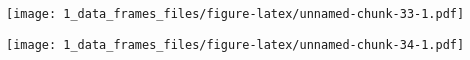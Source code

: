 \documentclass[
]{article}
\newenvironment{Shaded}{\begin{snugshade}}{\end{snugshade}}
\newcommand{\FunctionTok}[1]{\textcolor[rgb]{0.00,0.00,0.00}{#1}}
\newcommand{\NormalTok}[1]{#1}
\newcommand{\SpecialCharTok}[1]{\textcolor[rgb]{0.00,0.00,0.00}{#1}}
\begin{document}
\begin{Shaded}
\end{Shaded}

\texttt{[image: 1\_data\_frames\_files/figure-latex/unnamed-chunk-33-1.pdf]}

\begin{Shaded}
\end{Shaded}

\texttt{[image: 1\_data\_frames\_files/figure-latex/unnamed-chunk-34-1.pdf]}
\end{document}
